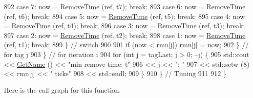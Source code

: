 \begin{DoxyCode}
892         \textcolor{keywordflow}{case} 7:  now = \hyperlink{classPacketTagListTest_aeec7c5d85e7d0d330849a18a91ca60a1}{RemoveTime} (ref, t7);  \textcolor{keywordflow}{break};
893         \textcolor{keywordflow}{case} 6:  now = \hyperlink{classPacketTagListTest_aeec7c5d85e7d0d330849a18a91ca60a1}{RemoveTime} (ref, t6);  \textcolor{keywordflow}{break};
894         \textcolor{keywordflow}{case} 5:  now = \hyperlink{classPacketTagListTest_aeec7c5d85e7d0d330849a18a91ca60a1}{RemoveTime} (ref, t5);  \textcolor{keywordflow}{break};
895         \textcolor{keywordflow}{case} 4:  now = \hyperlink{classPacketTagListTest_aeec7c5d85e7d0d330849a18a91ca60a1}{RemoveTime} (ref, t4);  \textcolor{keywordflow}{break};
896         \textcolor{keywordflow}{case} 3:  now = \hyperlink{classPacketTagListTest_aeec7c5d85e7d0d330849a18a91ca60a1}{RemoveTime} (ref, t3);  \textcolor{keywordflow}{break};
897         \textcolor{keywordflow}{case} 2:  now = \hyperlink{classPacketTagListTest_aeec7c5d85e7d0d330849a18a91ca60a1}{RemoveTime} (ref, t2);  \textcolor{keywordflow}{break};
898         \textcolor{keywordflow}{case} 1:  now = \hyperlink{classPacketTagListTest_aeec7c5d85e7d0d330849a18a91ca60a1}{RemoveTime} (ref, t1);  \textcolor{keywordflow}{break};
899         \}  \textcolor{comment}{// switch}
900         
901         \textcolor{keywordflow}{if} (now < rmn[j]) rmn[j] = now;
902       \} \textcolor{comment}{// for tag j}
903     \} \textcolor{comment}{// for iteration i}
904     \textcolor{keywordflow}{for} (\textcolor{keywordtype}{int} j = tagLast; j > 0; --j) \{
905       std::cout << \hyperlink{classns3_1_1TestCase_a28f7bb59669c24dae1c290fc17fc9b62}{GetName} () << \textcolor{stringliteral}{"min remove time: t"}
906                 << j          << \textcolor{stringliteral}{": "}
907                 << std::setw (8) << rmn[j]     << \textcolor{stringliteral}{" ticks"}
908                 << std::endl;
909     \}
910   \}  \textcolor{comment}{// Timing}
911     
912 \}
\end{DoxyCode}


Here is the call graph for this function\+:


